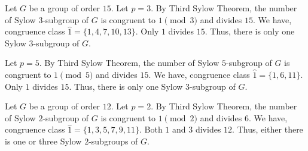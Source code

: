 \begin{remark}
	Let $G$ be a group of order $15$.
	Let $p = 3$.
	By Third Sylow Theorem, the number of Sylow $3$-subgroup of $G$ is congruent to $1 \pmod{3}$ and divides $15$.
	We have, congruence class $\hat{1} = \{ 1,4,7,10,13 \}$.
	Only $1$ divides $15$.
	Thus, there is only one Sylow $3$-subgroup of $G$.

	Let $p = 5$.
	By Third Sylow Theorem, the number of Sylow $5$-subgroup of $G$ is congruent to $1 \pmod{5}$ and divides $15$.
	We have, congruence class $\hat{1} = \{ 1,6,11 \}$.
	Only $1$ divides $15$.
	Thus, there is only one Sylow $3$-subgroup of $G$.
\end{remark}

\begin{remark}
	Let $G$ be a group of order $12$.
	Let $p = 2$.
	By Third Sylow Theorem, the number of Sylow $2$-subgroup of $G$ is congruent to $1 \pmod{2}$ and divides $6$.
	We have, congruence class $\hat{1} = \{ 1,3,5,7,9,11 \}$.
	Both $1$ and $3$ divides $12$.
	Thus, either there is one or three Sylow $2$-subgroups of $G$.
\end{remark}

